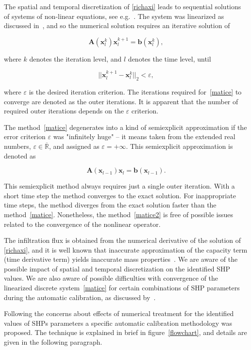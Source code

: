 \documentclass[review,times,3p,twocolumn,10pt]{elsarticle}
\newenvironment{lineq}
    {\begin{linenomath*}
    \begin{equation}
    }
    { 
    \end{equation} 
    \end{linenomath*}
    }
\renewcommand{\vec}{\mathbf}
\begin{document}
 
 The spatial and temporal discretization of \eqref{richaxi} leads to sequential solutions of systems of non-linear equations, see e.g.~\citep{mojecomp}. The system was linearized as discussed in~\citet{mojeacta, mojeamc}, and so the numerical solution requires an iterative solution of 
\begin{lineq}
\label{matice}
\mathbf{A}(\vec{x}_l^k) \vec{x}_l^{k+1} = \vec{b}(\vec{x}_l^k),
\end{lineq}
where $k$ denotes the iteration level, and $l$ denotes the time level, until \begin{lineq} \label{picard} ||\vec{x}_l^{k+1} - \vec{x}_l^k||_2 < \varepsilon , \end{lineq} where $\varepsilon$ is the desired iteration criterion. The iterations required for~\eqref{matice} to converge are denoted as the outer iterations. It is apparent that the number of required outer iterations depends on the $\varepsilon$ criterion. 


The method~\eqref{matice} degenerates into a kind of semiexplicit approximation if the error criterion $\varepsilon$ was "infinitely huge" -- it means taken from the extended real numbers, $\varepsilon \in {\overline {\mathbb {R} }}$, and assigned as $\varepsilon = + \infty$. This semiexplicit approximation is denoted as
\begin{lineq}
\label{matice2}
\mathbf{A}(\vec{x}_{l-1}) \vec{x}_l = \vec{b}(\vec{x}_{l-1}).
\end{lineq}
 This semiexplicit method always requires just a single outer iteration. With a short time step the method converges to the exact solution. For inappropriate time steps, the method diverges from the exact solution faster than the method~\eqref{matice}. Nonetheless, the method~\eqref{matice2} is free of possible issues related to the convergence of the nonlinear operator.

The infiltration flux is obtained from the numerical derivative of the solution of \eqref{richaxi},  and  it is well known that inaccurate approximation of the capacity term (time derivative term) yields inaccurate mass properties~\citep{celia}. We are aware of the possible impact of spatial and temporal discretization on the identified SHP values. We are also aware of possible difficulties with convergence of the linearized discrete system~\eqref{matice} for certain combinations of SHP parameters during the automatic calibration, as discussed by~\cite{beven2003-uncertain}.

Following the concerns about  effects of numerical treatment for the identified values of SHPs parameters a specific  automatic calibration methodology was proposed. The technique is explained in brief in figure~\ref{flowchart}, and  details are given in the following paragraph.
 
\end{document}
